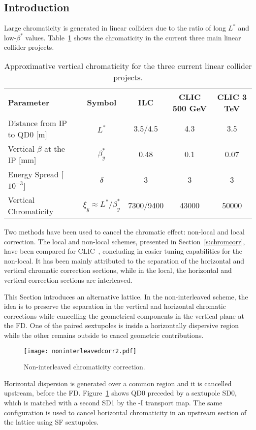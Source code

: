 \subsection{Introduction}
Large chromaticity is generated in linear colliders due to the ratio of long $L^*$ and low-$\beta^*$ values. Table~\ref{t:chromlat} shows the chromaticity in the current three main linear collider projects.\par
\begin{table}[!htb]
\centering
\begin{tabular}{l|c||c|c|c}\hline
Parameter & Symbol & ILC & CLIC 500 GeV& CLIC 3 TeV\\\hline\hline
Distance from IP to QD0 [m] & $L^*$& 3.5/4.5 & 4.3 & 3.5\\
Vertical $\beta$ at the IP [mm] &$\beta_y^*$& 0.48 & 0.1&0.07\\
Energy Spread [$10^{-3}$]& $\delta$&3&3&3\\\hline
Vertical Chromaticity & $\xi_y\approx L^*/\beta^*_y$&7300/9400&43000&50000\\\hline
\end{tabular}\caption{Approximative vertical chromaticity for the three current linear collider projects.}\label{t:chromlat}
\end{table}
Two methods have been used to cancel the chromatic effect: non-local and local correction. The local and non-local schemes, presented in Section~\ref{s:chromcorr}, have been compared for CLIC~\cite{PhysRevSTAB.17.101001}, concluding in easier tuning capabilities for the non-local. It has been mainly attributed to the separation of the horizontal and vertical chromatic correction sections, while in the local, the horizontal and vertical correction sections are interleaved.\par
This Section introduces an alternative lattice. In the non-interleaved scheme, the idea is to preserve the separation in the vertical and horizontal chromatic corrections  while cancelling the geometrical components in the vertical plane at the FD. One of the paired sextupoles is inside a horizontally dispersive region while the other remains outside to cancel geometric contributions.\par
\begin{figure}[!htb]
   \centering
   \texttt{[image: noninterleavedcorr2.pdf]}
   \caption{Non-interleaved chromaticity correction.}
   \label{f-noninterleaved}
\end{figure}
 Horizontal dispersion is generated over a common region and it is cancelled upstream, before the FD. Figure~\ref{f-noninterleaved} shows QD0 preceded by a sextupole SD0, which is matched with a second SD1 by the -I transport map. The same configuration is used to cancel horizontal chromaticity in an upstream section of the lattice using SF sextupoles.\par

